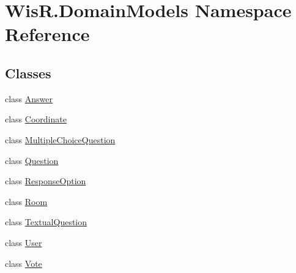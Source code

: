 \hypertarget{namespace_wis_r_1_1_domain_models}{}\section{Wis\+R.\+Domain\+Models Namespace Reference}
\label{namespace_wis_r_1_1_domain_models}
\subsection*{Classes}
\begin{DoxyCompactItemize}
\item 
class \hyperlink{class_wis_r_1_1_domain_models_1_1_answer}{Answer}
\item 
class \hyperlink{class_wis_r_1_1_domain_models_1_1_coordinate}{Coordinate}
\item 
class \hyperlink{class_wis_r_1_1_domain_models_1_1_multiple_choice_question}{Multiple\+Choice\+Question}
\item 
class \hyperlink{class_wis_r_1_1_domain_models_1_1_question}{Question}
\item 
class \hyperlink{class_wis_r_1_1_domain_models_1_1_response_option}{Response\+Option}
\item 
class \hyperlink{class_wis_r_1_1_domain_models_1_1_room}{Room}
\item 
class \hyperlink{class_wis_r_1_1_domain_models_1_1_textual_question}{Textual\+Question}
\item 
class \hyperlink{class_wis_r_1_1_domain_models_1_1_user}{User}
\item 
class \hyperlink{class_wis_r_1_1_domain_models_1_1_vote}{Vote}
\end{DoxyCompactItemize}

